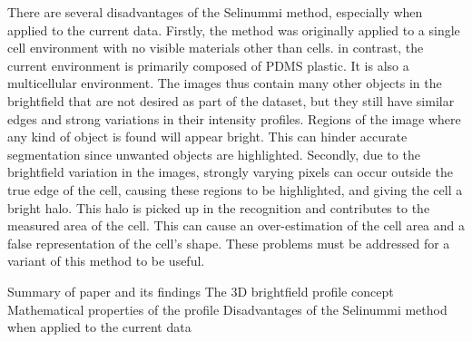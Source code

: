 There are several disadvantages of the Selinummi method, especially when applied to the current data. Firstly, the method was originally applied to a single cell environment with no visible materials other than cells. in contrast, the current environment is primarily composed of PDMS plastic. It is also a multicellular environment. The images thus contain many other objects in the brightfield that are not desired as part of the dataset, but they still have similar edges and strong variations in their intensity profiles. Regions of the image where any kind of object is found will appear bright. This can hinder accurate segmentation since unwanted objects are highlighted. Secondly, due to the brightfield variation in the images, strongly varying pixels can occur outside the true edge of the cell, causing these regions to be highlighted, and giving the cell a bright halo. This halo is picked up in the recognition and contributes to the measured area of the cell. This can cause an over-estimation of the cell area and a false representation of the cell's shape. These problems must be addressed for a variant of this method to be useful.

Summary of paper and its findings
The 3D brightfield profile concept
Mathematical properties of the profile
Disadvantages of the Selinummi method when applied to the current data
